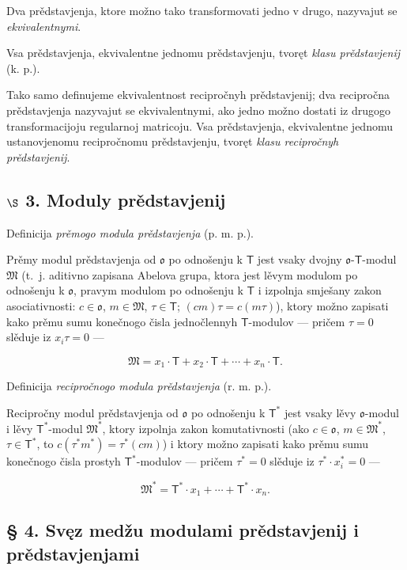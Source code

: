 \documentclass[11pt]{article}
\begin{document}
Dva prědstavjenja, ktore možno tako transformovati jedno v drugo, nazyvajut se \emph{ekvivalentnymi}.

Vsa prědstavjenja, ekvivalentne jednomu prědstavjenju, tvoręt \emph{klasu prědstavjenij} (k. p.).

Tako samo definujeme ekvivalentnost recipročnyh prědstavjenij; dva recipročna prědstavjenja nazyvajut se ekvivalentnymi, ako jedno možno dostati iz drugogo transformacijoju regularnoj matricoju. Vsa prědstavjenja, ekvivalentne jednomu ustanovjenomu recipročnomu prědstavjenju, tvoręt \emph{klasu recipročnyh prědstavjenij}.

\subsection*{\texorpdfstring{\(\S\) 3. Moduly prědstavjenij}{\textbackslash S 3. Moduly prědstavjenij}}\label{s-3.-darstellungsmoduln}

Definicija \emph{prěmogo modula prědstavjenja} (p. m. p.).

Prěmy modul prědstavjenja od \(\mathfrak{o}\) po odnošenju k \(\mathsf T\) jest vsaky dvojny \(\mathfrak{o}\)-\(\mathsf T\)-modul \(\mathfrak M\) (t.~j. aditivno zapisana Abelova grupa, ktora jest lěvym modulom po odnošenju k \(\mathfrak{o}\), pravym modulom po odnošenju k \(\mathsf T\) i izpolnja smješany zakon asociativnosti: \(c\in\mathfrak{o}\), \(m\in\mathfrak M\), \(\tau\in\mathsf T\); \((cm)\tau=c(m\tau)\)), ktory možno zapisati kako prěmu sumu konečnogo čisla jednočlennyh \(\mathsf T\)-modulov --- pričem \(\tau=0\) slěduje iz \(x_i\tau=0\) ---

\[
\mathfrak M=x_1\cdot\mathsf T+x_2\cdot\mathsf T+\cdots+x_n\cdot\mathsf T.
\]

Definicija \emph{recipročnogo modula prědstavjenja} (r. m. p.).

Recipročny modul prědstavjenja od \(\mathfrak{o}\) po odnošenju k \(\mathsf T^*\) jest vsaky lěvy \(\mathfrak{o}\)-modul i lěvy \(\mathsf T^*\)-modul \(\mathfrak M^*\), ktory izpolnja zakon komutativnosti (ako \(c\in\mathfrak{o}\), \(m\in\mathfrak M^*\), \(\tau\in\mathsf T^*\), to \(c(\tau^*m^*)=\tau^*(cm)\)) i ktory možno zapisati kako prěmu sumu konečnogo čisla prostyh \(\mathsf T^*\)-modulov --- pričem \(\tau^*=0\) slěduje iz \(\tau^*\cdot x_i^*=0\) ---

\[
\mathfrak M^*=\mathsf T^*\cdot x_1+\cdots+\mathsf T^*\cdot x_n.
\]

\subsection*{§ 4. Svęz medžu modulami prědstavjenij i prědstavjenjami}\label{der-zusammenhang-zwischen-darstellungsmoduln-und-darstellungen}
\end{document}
